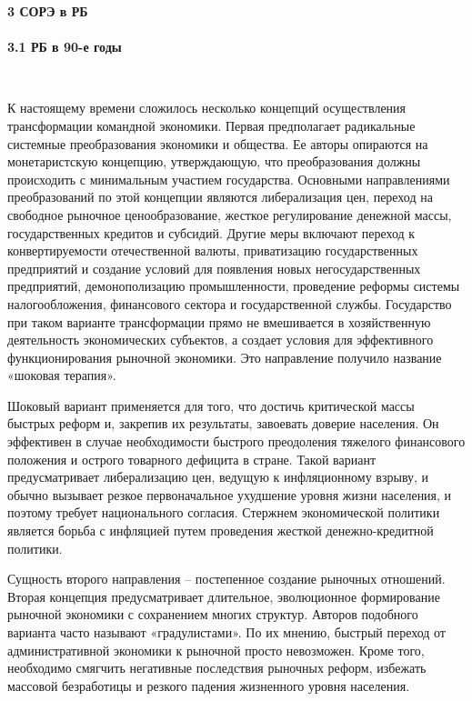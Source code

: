 \documentclass[14pt,a4paper]{article}
\begin{document}
    \newpage
    \begin{center}
        \textbf{3 СОРЭ в РБ}
        \\
        \HRule\\[0.5cm]
        \textbf{3.1 РБ в 90-е годы}
    \end{center}
    \\
    \par
    К настоящему времени сложилось несколько концепций осуществления трансформации командной экономики.
    Первая предполагает радикальные системные преобразования экономики и общества.
    Ее авторы опираются на монетаристскую концепцию, утверждающую, что преобразования должны происходить с минимальным участием государства.
    Основными направлениями преобразований по этой концепции являются либерализация цен, переход на свободное рыночное ценообразование, жесткое регулирование денежной массы, государственных кредитов и субсидий.
    Другие меры включают переход к конвертируемости отечественной валюты, приватизацию государственных предприятий и создание условий для появления новых негосударственных предприятий, демонополизацию промышленности, проведение реформы системы налогообложения, финансового сектора и государственной службы.
    Государство при таком варианте трансформации прямо не вмешивается в хозяйственную деятельность экономических субъектов, а создает условия для эффективного функционирования рыночной экономики.
    Это направление получило название «шоковая терапия».
    \par
    Шоковый вариант применяется для того, что достичь критической массы быстрых реформ и, закрепив их результаты, завоевать доверие населения.
    Он эффективен в случае необходимости быстрого преодоления тяжелого финансового положения и острого товарного дефицита в стране.
    Такой вариант предусматривает либерализацию цен, ведущую к инфляционному взрыву, и обычно вызывает резкое первоначальное ухудшение уровня жизни населения, и поэтому требует национального согласия.
    Стержнем экономической политики является борьба с инфляцией путем проведения жесткой денежно-кредитной политики.
    \par
    Сущность второго направления – постепенное создание рыночных отношений.
    Вторая концепция предусматривает длительное, эволюционное формирование рыночной экономики с сохранением многих структур.
    Авторов подобного варианта часто называют «градулистами».
    По их мнению, быстрый переход от административной экономики к рыночной просто невозможен.
    Кроме того, необходимо смягчить негативные последствия рыночных реформ, избежать массовой безработицы и резкого падения жизненного уровня населения.
\end{document}
